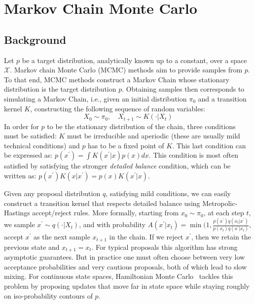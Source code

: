 \section{Markov Chain Monte Carlo}

\subsection{Background}

Let $p$ be a target distribution, analytically known up to a constant, over a space $\mathcal{X}$. Markov chain Monte Carlo (MCMC) methods aim to provide samples from $p$. To that end, MCMC methods construct a Markov Chain whose stationary distribution is the target distribution $p$. Obtaining samples then corresponds to simulating a Markov Chain, i.e., given an initial distribution $\pi_0$ and a transition kernel $K$, constructing the following sequence of random variables: 
\begin{equation}
X_0 \sim \pi_0, \quad X_{t+1} \sim K(\cdot | X_t)
\end{equation} 
In order for $p$ to be the stationary distribution of the chain, three conditions must be satisfied: $K$ must be irreducible and aperiodic (these are usually mild technical conditions) and $p$ has to be a fixed point of $K$. This last condition can be expressed as: $p(x^\prime)=\int K(x^\prime|x)p(x)dx $. This condition is most often satisfied by satisfying the stronger \textit{detailed balance} condition, which can be written as: $p(x^\prime)K(x|x^\prime) = p(x)K(x^\prime|x)$. 

Given any proposal distribution $q$, satisfying mild conditions, we can easily construct a transition kernel that respects detailed balance using Metropolic-Hastings accept/reject rules. More formally, starting from $x_0\sim\pi_0$, at each step $t$, we sample $x^\prime\sim q(\cdot|X_t)$, and with probability $A(x^\prime|x_t) = \min(1, \frac{p(x^\prime)q(x_t|x^\prime)}{p(x_t)q(x^\prime|x_t)}$, accept $x^\prime$ as the next sample $x_{t+1}$ in the chain. If we reject $x^\prime$, then we retain the previous state and $x_{t+1}=x_t$. For typical proposals this algorithm has strong asymptotic guarantees. But in practice one must often choose between very low acceptance probabilities and very cautious proposals, both of which lead to slow mixing. For continuous state spaces, Hamiltonian Monte Carlo~\cite{neal2011mcmc} tackles this problem by proposing updates that move far in state space while staying roughly on iso-probability contours of $p$. 

